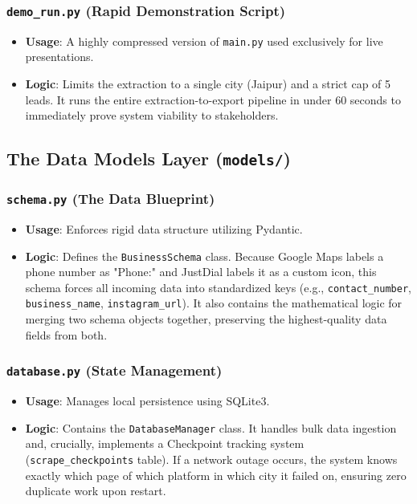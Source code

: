 \documentclass[12pt,a4paper]{article}
\begin{document}
\subsubsection{\texttt{demo\_run.py} (Rapid Demonstration Script)}
\begin{itemize}
    \item \textbf{Usage}: A highly compressed version of \texttt{main.py} used exclusively for live presentations.
    \item \textbf{Logic}: Limits the extraction to a single city (Jaipur) and a strict cap of 5 leads. It runs the entire extraction-to-export pipeline in under 60 seconds to immediately prove system viability to stakeholders.
\end{itemize}

\subsection{The Data Models Layer (\texttt{models/})}

\subsubsection{\texttt{schema.py} (The Data Blueprint)}
\begin{itemize}
    \item \textbf{Usage}: Enforces rigid data structure utilizing Pydantic.
    \item \textbf{Logic}: Defines the \texttt{BusinessSchema} class. Because Google Maps labels a phone number as "Phone:" and JustDial labels it as a custom icon, this schema forces all incoming data into standardized keys (e.g., \texttt{contact\_number}, \texttt{business\_name}, \texttt{instagram\_url}). It also contains the mathematical logic for merging two schema objects together, preserving the highest-quality data fields from both.
\end{itemize}

\subsubsection{\texttt{database.py} (State Management)}
\begin{itemize}
    \item \textbf{Usage}: Manages local persistence using SQLite3.
    \item \textbf{Logic}: Contains the \texttt{DatabaseManager} class. It handles bulk data ingestion and, crucially, implements a Checkpoint tracking system (\texttt{scrape\_checkpoints} table). If a network outage occurs, the system knows exactly which page of which platform in which city it failed on, ensuring zero duplicate work upon restart.
\end{itemize}
\end{document}
